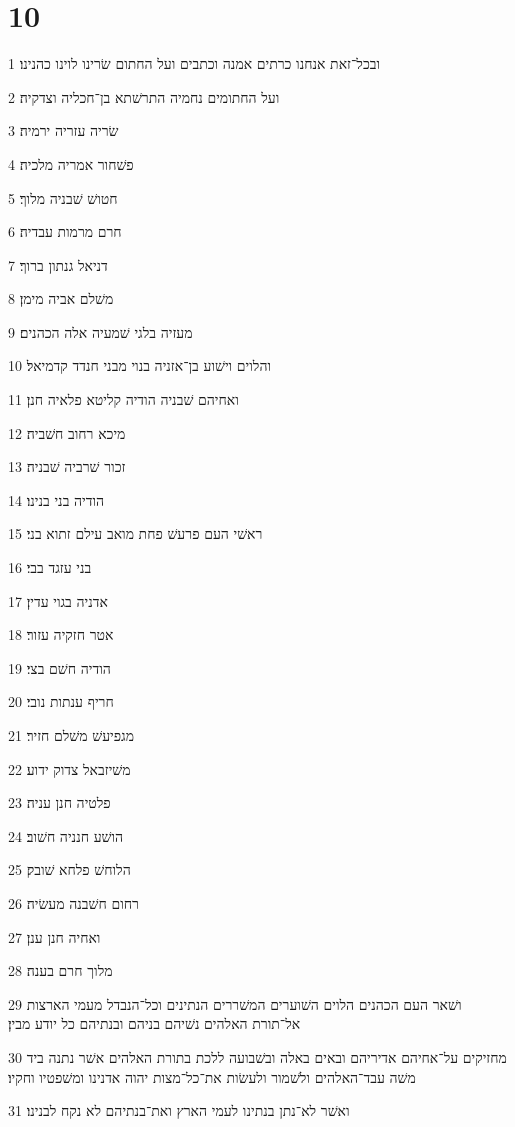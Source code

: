 \chapter{10}

\par 1 ובכל־זאת אנחנו כרתים אמנה וכתבים ועל החתום שׂרינו לוינו כהנינו׃
\par 2 ועל החתומים נחמיה התרשׁתא בן־חכליה וצדקיה׃
\par 3 שׂריה עזריה ירמיה׃
\par 4 פשׁחור אמריה מלכיה׃
\par 5 חטושׁ שׁבניה מלוך׃
\par 6 חרם מרמות עבדיה׃
\par 7 דניאל גנתון ברוך׃
\par 8 משׁלם אביה מימן׃
\par 9 מעזיה בלגי שׁמעיה אלה הכהנים׃
\par 10 והלוים וישׁוע בן־אזניה בנוי מבני חנדד קדמיאל׃
\par 11 ואחיהם שׁבניה הודיה קליטא פלאיה חנן׃
\par 12 מיכא רחוב חשׁביה׃
\par 13 זכור שׁרביה שׁבניה׃
\par 14 הודיה בני בנינו׃
\par 15 ראשׁי העם פרעשׁ פחת מואב עילם זתוא בני׃
\par 16 בני עזגד בבי׃
\par 17 אדניה בגוי עדין׃
\par 18 אטר חזקיה עזור׃
\par 19 הודיה חשׁם בצי׃
\par 20 חריף ענתות נובי׃
\par 21 מגפיעשׁ משׁלם חזיר׃
\par 22 משׁיזבאל צדוק ידוע׃
\par 23 פלטיה חנן עניה׃
\par 24 הושׁע חנניה חשׁוב׃
\par 25 הלוחשׁ פלחא שׁובק׃
\par 26 רחום חשׁבנה מעשׂיה׃
\par 27 ואחיה חנן ענן׃
\par 28 מלוך חרם בענה׃
\par 29 ושׁאר העם הכהנים הלוים השׁוערים המשׁררים הנתינים וכל־הנבדל מעמי הארצות אל־תורת האלהים נשׁיהם בניהם ובנתיהם כל יודע מבין׃
\par 30 מחזיקים על־אחיהם אדיריהם ובאים באלה ובשׁבועה ללכת בתורת האלהים אשׁר נתנה ביד משׁה עבד־האלהים ולשׁמור ולעשׂות את־כל־מצות יהוה אדנינו ומשׁפטיו וחקיו׃
\par 31 ואשׁר לא־נתן בנתינו לעמי הארץ ואת־בנתיהם לא נקח לבנינו׃
